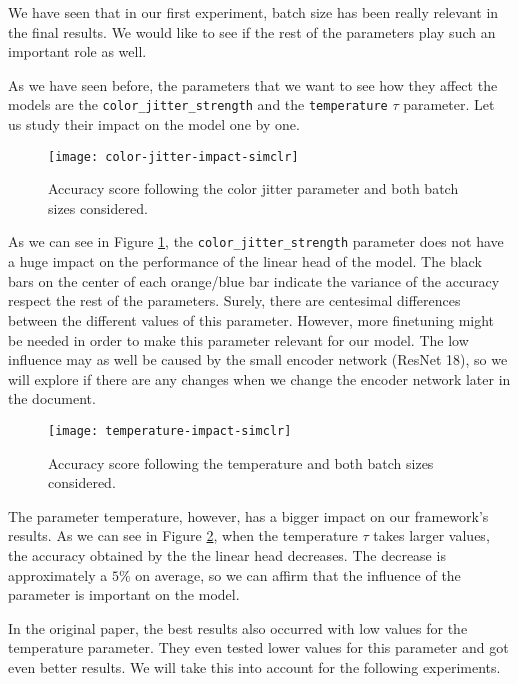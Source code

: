 We have seen that in our first experiment, batch size has been really relevant in the final results. We would like to see if the rest of the parameters play such an important role as well. 

As we have seen before, the parameters that we want to see how they affect the models are the \lstinline{color_jitter_strength} and the \lstinline{temperature} $\tau$ parameter. Let us study their impact on the model one by one. 

\begin{figure}[H] 
    \centering
    \texttt{[image: color-jitter-impact-simclr]}%
    
    \caption{Accuracy score following the color jitter parameter and both batch sizes considered.}
    
    \label{exp:simclr:colorjitter:impact}
\end{figure}

As we can see in Figure \ref{exp:simclr:colorjitter:impact}, the \lstinline{color_jitter_strength} parameter does not have a huge impact on the performance of the linear head of the model. The black bars on the center of each orange/blue bar indicate the variance of the accuracy respect the rest of the parameters. Surely, there are centesimal differences between the different values of this parameter. However, more finetuning might be needed in order to make this parameter relevant for our model. The low influence may as well be caused by the small encoder network (ResNet 18), so we will explore if there are any changes when we change the encoder network later in the document.

\begin{figure}[H] 
    \centering
        \texttt{[image: temperature-impact-simclr]}%
       
        \caption{Accuracy score following the temperature and both batch sizes considered.}
        
    \label{exp:simclr:temperature:impact}
\end{figure}

The parameter temperature, however, has a bigger impact on our framework's results. As we can see in Figure \ref{exp:simclr:temperature:impact}, when the temperature $\tau$ takes larger values, the accuracy obtained by the the linear head decreases. The decrease is approximately a $5\%$ on average, so we can affirm that the influence of the parameter is important on the model.

In the original paper, the best results also occurred with low values for the temperature parameter. They even tested lower values for this parameter and got even better results. We will take this into account for the following experiments.

